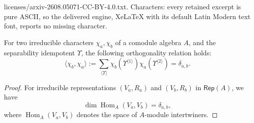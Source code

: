 \documentclass[10pt,a4paper]{amsart}
\newcommand{\Hom}{\operatorname{Hom}}
\newcommand{\Rep}{\mathsf{Rep}}
\begin{document}
licenses/arxiv-2608.05071-CC-BY-4.0.txt. Characters: every retained excerpt is pure ASCII, so the delivered engine, XeLaTeX with its default Latin Modern text font, reports no missing character.
\begin{lemma} \label{lem:Schur-orth}
For two irreducible characters $\chi_a,\chi_b$ of a comodule algebra $A$, and the separability idempotent $\Upsilon$, the following orthogonality relation holds:
\begin{equation}
\langle \chi_b,\chi_a\rangle
:=
\sum_{\langle \Upsilon\rangle}
\chi_b(\Upsilon^{\langle 1\rangle})
\chi_a(\Upsilon^{\langle 2\rangle})
=
\delta_{a,b}.
\end{equation}
\end{lemma}

\begin{proof}
For irreducible representations $(V_a,R_a)$ and $(V_b,R_b)$ in $\Rep(A)$, we have
\begin{equation*}
\dim \Hom_A(V_a,V_b)=\delta_{a,b},
\end{equation*}
where $\Hom_A(V_a,V_b)$ denotes the space of $A$-module intertwiners.


\end{proof}
\end{document}
